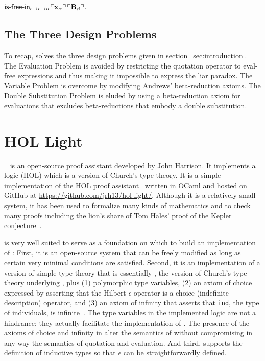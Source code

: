 \documentclass[fleqn]{llncs}
\begin{document}
  \item $\mbox{\sf is-free-in}_{\epsilon \rightarrow \epsilon \rightarrow o} \,
    \ulcorner\textbf{x}_\alpha\urcorner \, \ulcorner\textbf{B}_\beta\urcorner$.

\ee

\subsection{The Three Design Problems} 

To recap,
{\churchqe} solves the three design problems given in
section~\ref{sec:introduction}.  The Evaluation Problem is
avoided by restricting the quotation operator to eval-free expressions
and thus making it impossible to express the liar paradox.  The
Variable Problem is overcome by modifying Andrews' beta-reduction
axioms.  The Double Substitution Problem is eluded
by using a beta-reduction axiom for evaluations that excludes
beta-reductions that embody a double substitution.

\section{HOL Light}\label{sec:hol-light}

\HL~\cite{Harrison09} is an open-source proof assistant developed by
John Harrison.  It implements a logic (HOL) which is a version of
Church's type theory.  It is a simple implementation of the HOL proof
assistant~\cite{GordonMelham93} written in OCaml and hosted on GitHub
at \url{https://github.com/jrh13/hol-light/}.  Although it is a
relatively small system, it has been used to formalize many kinds of
mathematics and to check many proofs including the lion's share of Tom
Hales' proof of the Kepler conjecture~\cite{HalesEtAl17}.

{\HL} is very well suited to serve as a foundation on which to build
an implementation of {\churchqe}: First, it is an open-source system
that can be freely modified as long as certain very minimal conditions
are satisfied.  Second, it is an implementation of a version of simple
type theory that is essentially {\qzero}, the version of Church's type
theory underlying {\churchqe}, plus (1) polymorphic type variables,
(2) an axiom of choice expressed by asserting that the Hilbert
$\epsilon$ operator is a choice (indefinite description) operator, and
(3) an axiom of infinity that asserts that \texttt{ind}, the type of
individuals, is infinite~\cite{Harrison09}.  The type variables in the
implemented logic are not a hindrance; they actually facilitate the
implementation of {\churchqe}.  The presence of the axioms of choice
and infinity in {\HL} alter the semantics of {\churchqe} without
compromising in any way the semantics of quotation and evaluation.
And third, \HL{} supports the definition of inductive types so that
$\epsilon$ can be straightforwardly defined.
\end{document}
